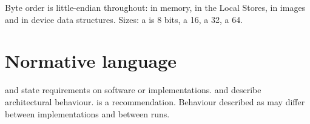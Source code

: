 Byte order is little-endian throughout: in memory, in the Local Stores, in images and in device
data structures. Sizes: a  is 8 bits, a  16, a  32, a
 64.

\section*{Normative language}
 and  state requirements on software or implementations.  and
 describe architectural behaviour.  is a recommendation. Behaviour described as
 may differ between implementations and between runs.
